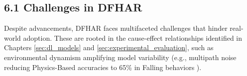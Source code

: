 \documentclass[Afour,sageh,times]{sagej}
\begin{document}


\subsection{6.1 Challenges in DFHAR}
\label{subsec:challenges}

Despite advancements, DFHAR faces multifaceted challenges that hinder real-world adoption. These are rooted in the cause-effect relationships identified in Chapters \ref{sec:dl_models} and \ref{sec:experimental_evaluation}, such as environmental dynamism amplifying model variability (e.g., multipath noise reducing Physics-Based accuracies to 65\% in Falling behaviors \citep{guo2019robust}).
\end{document}
